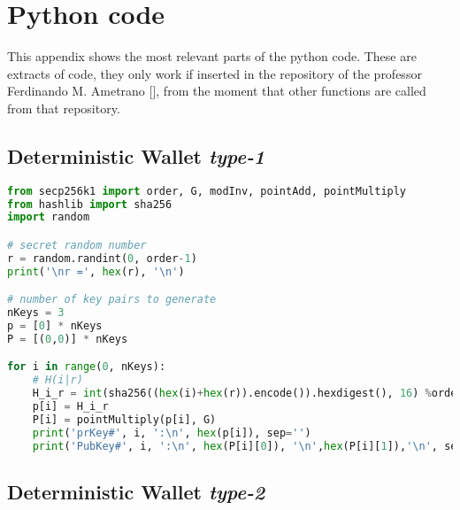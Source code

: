 \chapter{Python code}%
\label{AppendixB} %
This appendix shows the most relevant parts of the python code. These are extracts of code, they only work if inserted in the repository of the professor Ferdinando M. Ametrano [\cite{13}], from the moment that other functions are called from that repository.
 

\section{Deterministic Wallet \textit{type-1}}

\begin{lstlisting}[language=Python]
from secp256k1 import order, G, modInv, pointAdd, pointMultiply
from hashlib import sha256
import random

# secret random number
r = random.randint(0, order-1)
print('\nr =', hex(r), '\n')

# number of key pairs to generate
nKeys = 3
p = [0] * nKeys
P = [(0,0)] * nKeys

for i in range(0, nKeys):
	# H(i|r)
	H_i_r = int(sha256((hex(i)+hex(r)).encode()).hexdigest(), 16) %order
	p[i] = H_i_r
	P[i] = pointMultiply(p[i], G)
	print('prKey#', i, ':\n', hex(p[i]), sep='')
	print('PubKey#', i, ':\n', hex(P[i][0]), '\n',hex(P[i][1]),'\n', sep='')
\end{lstlisting}


\section{Deterministic Wallet \textit{type-2}}




